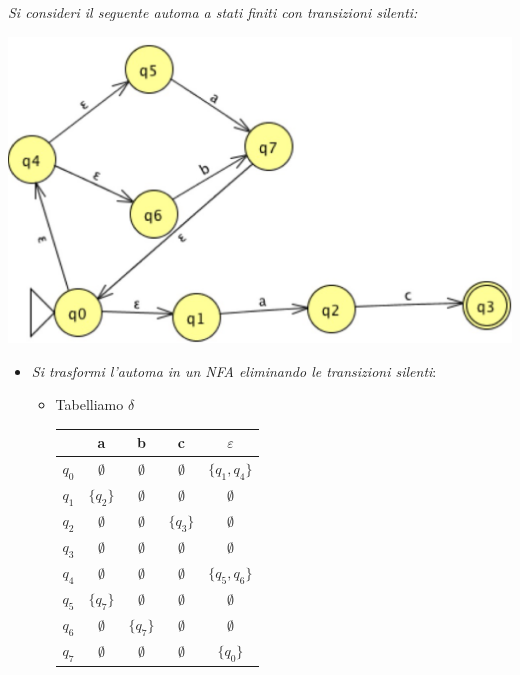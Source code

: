 \documentclass[12pt, a4paper]{report}
\begin{document}
                \begin{exercise}
                    \textit{Si consideri il seguente automa a stati finiti con transizioni silenti:}
                    \begin{center}
                        \includegraphics[width=.5\textwidth]{Images/esnfasilente.png}
                    \end{center}
                    \begin{itemize}
                        \item \textit{Si trasformi l'automa in un NFA eliminando le transizioni silenti}: \begin{itemize}
                            \item Tabelliamo $\delta$ \begin{center}
                                \begin{tabular}{|c|c|c|c|c|}
                                    \hline
                                     & a & b & c & $\varepsilon$ \\
                                    \hline
                                    $q_0$ & $\emptyset$ & $\emptyset$ & $\emptyset$ & $\{q_1,q_4\}$\\
                                    $q_1$ & $\{q_2\}$ & $\emptyset$ & $\emptyset$ & $\emptyset$ \\
                                    $q_2$ & $\emptyset$ & $\emptyset$ & $\{q_3\}$ & $\emptyset$ \\
                                    $q_3$ & $\emptyset$ & $\emptyset$ & $\emptyset$ & $\emptyset$ \\
                                    $q_4$ & $\emptyset$ & $\emptyset$ & $\emptyset$ & $\{q_5,q_6\}$\\
                                    $q_5$ & $\{q_7\}$ & $\emptyset$ & $\emptyset$ & $\emptyset$ \\
                                    $q_6$ & $\emptyset$ & $\{q_7\}$ & $\emptyset$ & $\emptyset$ \\
                                    $q_7$ & $\emptyset$ & $\emptyset$ & $\emptyset$ & $\{q_0\}$\\

\end{tabular}
\end{center}
\end{itemize}
\end{itemize}
\end{exercise}
\end{document}
